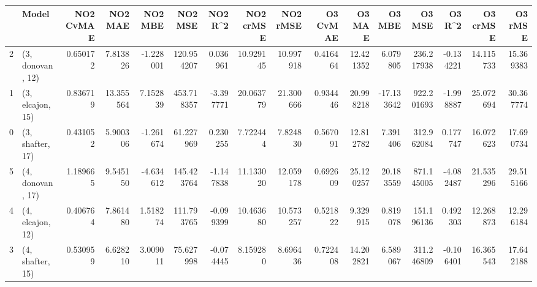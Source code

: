 \begin{tabular}{llrrrrrrrrrrrrrr}
\toprule
{} &             Model &  NO2 CvMAE &    NO2 MAE &   NO2 MBE &     NO2 MSE &   NO2 R\textasciicircum2 &  NO2 crMSE &   NO2 rMSE &  O3 CvMAE &     O3 MAE &     O3 MBE &      O3 MSE &    O3 R\textasciicircum2 &   O3 crMSE &    O3 rMSE \\
\midrule
2 &  (3, donovan, 12) &   0.650172 &   7.813826 & -1.228001 &  120.954207 &  0.036961 &  10.929145 &  10.997918 &  0.416464 &  12.421352 &   6.079805 &  236.217938 & -0.134221 &  14.115733 &  15.369383 \\
1 &  (3, elcajon, 15) &   0.836719 &  13.355564 &  7.152839 &  453.718357 & -3.397771 &  20.063779 &  21.300666 &  0.934446 &  20.998218 & -17.133642 &  922.201693 & -1.998887 &  25.072694 &  30.367774 \\
0 &  (3, shafter, 17) &   0.431052 &   5.900306 & -1.261674 &   61.227969 &  0.230255 &   7.722444 &   7.824830 &  0.567091 &  12.812782 &   7.391406 &  312.962084 &  0.177747 &  16.072623 &  17.690734 \\
5 &  (4, donovan, 17) &   1.189665 &   9.545150 & -4.634612 &  145.423764 & -1.147838 &  11.133020 &  12.059178 &  0.692609 &  25.120257 &  20.183559 &  871.145005 & -4.082487 &  21.535296 &  29.515166 \\
4 &  (4, elcajon, 12) &   0.406764 &   7.861480 &  1.518274 &  111.793765 & -0.099399 &  10.463680 &  10.573257 &  0.521822 &   9.329915 &   0.819078 &  151.196136 &  0.492303 &  12.268873 &  12.296184 \\
3 &  (4, shafter, 15) &   0.530959 &   6.628210 &  3.009011 &   75.627998 & -0.074445 &   8.159280 &   8.696436 &  0.722408 &  14.202821 &   6.589067 &  311.246809 & -0.106401 &  16.365543 &  17.642188 \\
\bottomrule
\end{tabular}
